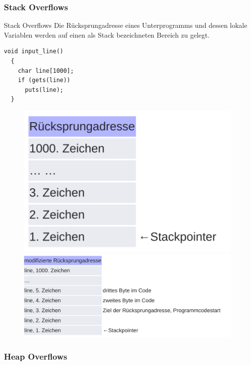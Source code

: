 \documentclass[10pt]{beamer}
\begin{document}
\subsubsection{Stack Overflows}

\begin{frame}[fragile]{Stack Overflows}
 Die R\"ucksprungadresse eines Unterprogramms und dessen lokale Variablen werden auf einen als Stack bezeichneten Bereich zu gelegt.
 \begin{lstlisting}[style=CStyle]
  void input_line()
  {
    char line[1000];
    if (gets(line))
      puts(line);
  }
 \end{lstlisting}

 \begin{figure}%
  \centering
  {\includegraphics[scale=0.10]{stackoverflow}}%
  \quad
  {\includegraphics[scale=0.10]{stackoverflow_2}}%
 \end{figure}
\end{frame}

\subsubsection{Heap Overflows}
\end{document}
